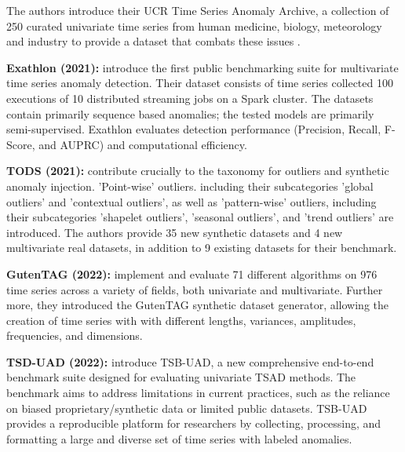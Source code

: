 \documentclass[12pt,oneside]{article}
\begin{document}
The authors introduce their UCR Time Series Anomaly Archive, a collection of 250 curated univariate time series from human medicine, biology, meteorology and industry to provide a dataset that combats these issues \parencite{wu2021current}. \par
\textbf{Exathlon (2021):} \cite{jacob2021exathlonbenchmarkexplainableanomaly} introduce the first public benchmarking suite for multivariate time series anomaly detection. Their dataset consists of time series collected 100 executions of 10 distributed streaming jobs on a Spark cluster. The datasets contain primarily sequence based anomalies; the tested models are primarily semi-supervised. Exathlon evaluates detection performance (Precision, Recall, F-Score, and AUPRC) and computational efficiency. \par
\textbf{TODS (2021):} \cite{NEURIPS} contribute crucially to the taxonomy for outliers and synthetic anomaly injection. 'Point-wise' outliers. including their subcategories 'global outliers' and 'contextual outliers', as well as 'pattern-wise' outliers, including their subcategories 'shapelet outliers', 'seasonal outliers', and 'trend outliers' are introduced. The authors provide 35 new synthetic datasets and 4 new multivariate real datasets, in addition to 9 existing datasets for their benchmark. \par
\textbf{GutenTAG (2022):} \cite{SchmidlEtAl2022Anomaly} implement and evaluate 71 different algorithms on 976 time series across a variety of fields, both univariate and multivariate. Further more, they introduced the GutenTAG synthetic dataset generator, allowing the creation of time series with with different lengths, variances, amplitudes, frequencies, and dimensions. \par
\textbf{TSD-UAD (2022):} \cite{paparrizos2022tsb} introduce TSB-UAD, a new comprehensive end-to-end benchmark suite designed for evaluating univariate TSAD methods. The benchmark aims to address limitations in current practices, such as the reliance on biased proprietary/synthetic data or limited public datasets. TSB-UAD provides a reproducible platform for researchers by collecting, processing, and formatting a large and diverse set of time series with labeled anomalies.
\end{document}
